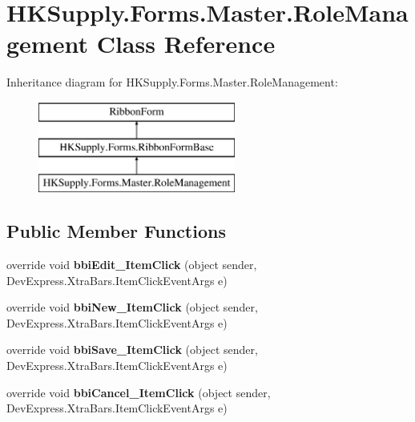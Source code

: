 \hypertarget{class_h_k_supply_1_1_forms_1_1_master_1_1_role_management}{}\section{H\+K\+Supply.\+Forms.\+Master.\+Role\+Management Class Reference}
\label{class_h_k_supply_1_1_forms_1_1_master_1_1_role_management}
Inheritance diagram for H\+K\+Supply.\+Forms.\+Master.\+Role\+Management\+:\begin{figure}[H]
\begin{center}
\leavevmode
\includegraphics[height=3.000000cm]{class_h_k_supply_1_1_forms_1_1_master_1_1_role_management}
\end{center}
\end{figure}
\subsection*{Public Member Functions}
\begin{DoxyCompactItemize}
\item 
\mbox{\label{class_h_k_supply_1_1_forms_1_1_master_1_1_role_management_a086c9b7f735cce878895dd31d2588c83}} 
override void {\bfseries bbi\+Edit\+\_\+\+Item\+Click} (object sender, Dev\+Express.\+Xtra\+Bars.\+Item\+Click\+Event\+Args e)
\item 
\mbox{\label{class_h_k_supply_1_1_forms_1_1_master_1_1_role_management_aebc22a779ee7d4315846029e9dfddffd}} 
override void {\bfseries bbi\+New\+\_\+\+Item\+Click} (object sender, Dev\+Express.\+Xtra\+Bars.\+Item\+Click\+Event\+Args e)
\item 
\mbox{\label{class_h_k_supply_1_1_forms_1_1_master_1_1_role_management_addd62e18de3d259c078bffe9fa67372a}} 
override void {\bfseries bbi\+Save\+\_\+\+Item\+Click} (object sender, Dev\+Express.\+Xtra\+Bars.\+Item\+Click\+Event\+Args e)
\item 
\mbox{\label{class_h_k_supply_1_1_forms_1_1_master_1_1_role_management_a0741c32945674c614a400c77b2092734}} 
override void {\bfseries bbi\+Cancel\+\_\+\+Item\+Click} (object sender, Dev\+Express.\+Xtra\+Bars.\+Item\+Click\+Event\+Args e)
\end{DoxyCompactItemize}
